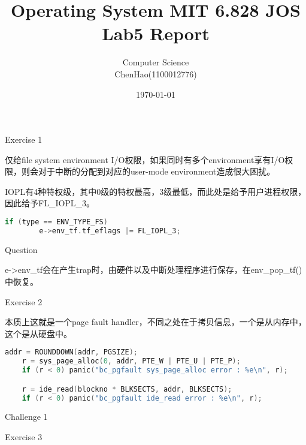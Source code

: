 \documentclass[GBK,winfonts,a4paper,10pt]{ctexart}
\begin{document}
\rhead{}
\lhead{}
\cfoot{\thepage}
\renewcommand{\footrulewidth}{0.4pt}
\renewcommand{\algorithmicrequire}{\textbf{Input:}}
\renewcommand{\algorithmicensure}{\textbf{Output:}}
\setlength{\tabcolsep}{2pt}

\setlength{\parindent}{2em}

\thispagestyle{fancy}


\title{Operating System MIT 6.828 JOS Lab5 Report}
\author{Computer Science \\ ChenHao(1100012776) }
\date{\today}
\maketitle

\thispagestyle{fancy}

\tableofcontents

\newpage

\begin{section}{ Exercise 1 }
\par
仅给file system environment I/O权限，如果同时有多个environment享有I/O权限，则会对于中断的分配到对应的user-mode environment造成很大困扰。
\par
IOPL有4种特权级，其中0级的特权最高，3级最低，而此处是给予用户进程权限，因此给予FL_IOPL_3。
\begin{lstlisting}[language=C]
    if (type == ENV_TYPE_FS)
        e->env_tf.tf_eflags |= FL_IOPL_3;        
\end{lstlisting}
\end{section}

\begin{section}{ Question }
\par
e->env_tf会在产生trap时，由硬件以及中断处理程序进行保存，在env_pop_tf()中恢复。
\end{section}

\begin{section}{ Exercise 2 }
\par
本质上这就是一个page fault handler，不同之处在于拷贝信息，一个是从内存中，这个是从硬盘中。
\begin{lstlisting}[language=C]
    	addr = ROUNDDOWN(addr, PGSIZE);
	r = sys_page_alloc(0, addr, PTE_W | PTE_U | PTE_P);
	if (r < 0) panic("bc_pgfault sys_page_alloc error : %e\n", r);

	r = ide_read(blockno * BLKSECTS, addr, BLKSECTS);
	if (r < 0) panic("bc_pgfault ide_read error : %e\n", r);       
\end{lstlisting}
\end{section}

\begin{section}{ Challenge 1 }
\end{section}

\begin{section}{ Exercise 3 }
\end{section}
\end{document}
